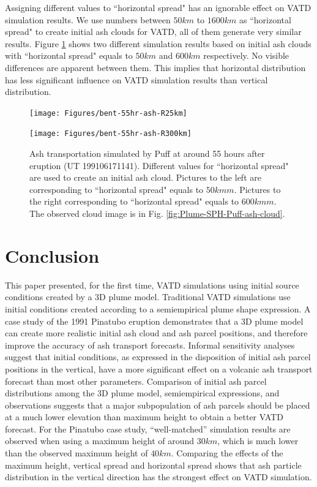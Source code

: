 \documentclass[draft,linenumbers]{agujournal2019}
\begin{document}
Assigning different values to ``horizontal spread" has an ignorable effect on VATD simulation results. We use numbers between $50 km$ to $1600 km$ as ``horizontal spread" to create initial ash clouds for VATD, all of them generate very similar results. Figure \ref{fig:ash-distribution-horizontal-compare} shows two different simulation results based on initial ash clouds with ``horizontal spread" equals to $50 km$ and $600 km$ respectively. No visible differences are apparent between them. This implies that horizontal distribution has less significant influence on VATD simulation results than vertical distribution.

\begin{figure}[!htb]
\centering
\begin{minipage}{.325 \textwidth}
\centering
\texttt{[image: Figures/bent-55hr-ash-R25km]}
\end{minipage}%
\begin{minipage}{.325 \textwidth}
\centering
\texttt{[image: Figures/bent-55hr-ash-R300km]}
\end{minipage}%
\caption{Ash transportation simulated by Puff at around 55 hours after eruption (UT 199106171141). Different values for ``horizontal spread" are used to create an initial ash cloud. Pictures to the left are corresponding to ``horizontal spread" equals to $50 km m$. Pictures to the right corresponding to ``horizontal spread" equals to $600 km m$. The observed cloud image is in Fig. \ref{fig:Plume-SPH-Puff-ash-cloud}.}
\label{fig:ash-distribution-horizontal-compare}
\end{figure}

\section{Conclusion}

This paper presented, for the first time, VATD simulations using initial source conditions created by a 3D plume model. Traditional VATD simulations use initial conditions created according to a semiempirical plume shape expression. A case study of the 1991 Pinatubo eruption demonstrates that a 3D plume model can create more realistic initial ash cloud and ash parcel positions, and therefore improve the accuracy of ash transport forecasts. Informal sensitivity analyses suggest that initial conditions, as expressed in the disposition of initial ash parcel positions in the vertical, have a more significant effect on a volcanic ash transport forecast than most other parameters. Comparison of initial ash parcel distributions among the 3D plume model, semiempirical expressions, and observations suggests that a major subpopulation of ash parcels should be placed at a much lower elevation than maximum height to obtain a better VATD forecast. For the Pinatubo case study, ``well-matched'' simulation results are observed when using a maximum height of around $30 km$, which is much lower than the observed maximum height of $40 km$. Comparing the effects of the maximum height, vertical spread and horizontal spread shows that ash particle distribution in the vertical direction has the strongest effect on VATD simulation.
\end{document}
